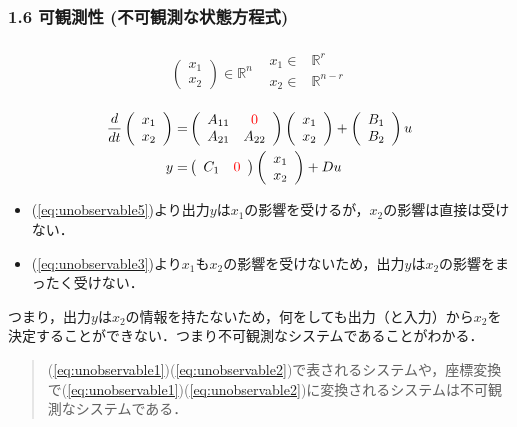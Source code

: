 \documentclass[10pt]{beamer}
\begin{document}
\begin{frame}[t]
\frametitle{1.6 可観測性 (不可観測な状態方程式)}
% 

\begin{align}
  \begin{array}{cc}
    \left(
      \begin{array}{c}
         x_1 \\  x_2
      \end{array}
    \right)\in \mathbb{R}^{n} &
    \begin{aligned}
       x_1 \in& \mathbb{R}^r \\
       x_2 \in& \mathbb{R}^{n-r} \\
    \end{aligned}
  \end{array} \nonumber
\end{align}
\begin{align}
  \frac{d}{dt}
  \left(
    \begin{array}{c}
      x_1 \\ x_2
    \end{array}
  \right) =& \left(
    \begin{array}{cc}
      A_{11} & \textcolor{red}{0} \\ A_{21} & A_{22}
    \end{array}
  \right)
  \left(
    \begin{array}{c}
      x_1 \\ x_2
    \end{array}
  \right) +
  \left(
    \begin{array}{c}
      B_1 \\ B_2
    \end{array}
  \right) u \\
  y =& \left(
    \begin{array}{cc}
      C_1 & \textcolor{red}{0}
    \end{array}
  \right)
  \left(
    \begin{array}{c}
      x_1 \\ x_2
    \end{array}
  \right) + D u 
\end{align}
\begin{itemize}
\item (\ref{eq:unobservable5})より出力$y$は$x_1$の影響を受けるが，$x_2$の影響は直接は受けない．
\item (\ref{eq:unobservable3})より$x_1$も$x_2$の影響を受けないため，出力$y$は$x_2$の影響をまったく受けない．
\end{itemize}
つまり，出力$y$は$x_2$の情報を持たないため，何をしても出力（と入力）から$x_2$を決定することができない．つまり不可観測なシステムであることがわかる．
\begin{quote}
(\ref{eq:unobservable1})(\ref{eq:unobservable2})で表されるシステムや，座標変換で(\ref{eq:unobservable1})(\ref{eq:unobservable2})に変換されるシステムは不可観測なシステムである．
\end{quote}
\addtocounter{figure}{+1}
\end{frame}
\end{document}
